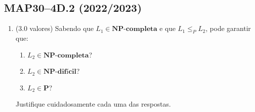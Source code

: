 \documentclass[a4paper,12pt]{article}
\begin{document}
\vspace{1.0cm}
\subsection*{MAP30–4D.2 (2022/2023)}
\begin{enumerate}[label=\alph*)]
    \item (3.0 valores) Sabendo que \( L_1 \in \mathbf{NP}\textbf{-completa} \) e que \( L_1 \leq_P L_2 \), pode garantir que:
    
    \begin{enumerate}[label=(\roman*)]
        \item \( L_2 \in \mathbf{NP}\textbf{-completa} \)?
        \item \( L_2 \in \mathbf{NP}\textbf{-difícil} \)?
        \item \( L_2 \in \mathbf{P} \)?
    \end{enumerate}
    
    Justifique cuidadosamente cada uma das respostas.
\end{enumerate}
\end{document}
